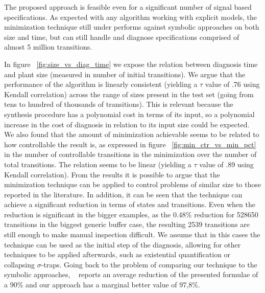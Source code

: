 The proposed approach is feasible even for a significant number of signal based specifications. 
As expected with any algorithm working with explicit models, the minimization technique still under performs against symbolic approaches on both size and time, but can still handle and diagnose specifications comprised of almost 5 million transitions.  

In figure ~\ref{fig:size_vs_diag_time} we expose the relation between diagnosis time and plant size (measured in number of initial transitions). We argue that the performance of the algorithm is linearly consistent (yielding a $\tau$ value of .76 using Kendall correlation) across the range of sizes present in the test set (going from tens to hundred of thousands of transitions). This is relevant because the synthesis procedure has a polynomial cost in terms of its input, so a polynomial increase in the cost of diagnosis in relation to its input size could be expected. 
We also found that the amount of minimization achievable seems to be related to how controllable the result is, as expressed in figure  ~\ref{fig:min_ctr_vs_min_pct} in the number of controllable transitions in the minimization over the number of total transitions. The relation seems to be linear (yielding a $\tau$ value of .89 using Kendall correlation).
From the results it is possible to argue that the minimization technique can be applied to control problems of similar size to those reported in the literature. 
In addition, it can be seen that the technique can achieve a significant reduction in terms of states and transitions. Even when the reduction is significant in the bigger examples, as the 0.48\% reduction for 528650 transitions in the biggest generic buffer case, the resulting 2539 transitions are still enough to make manual inspection difficult. We assume that in this cases the technique can be used as the initial step of the diagnosis, allowing for other techniques to be applied afterwards, such as existential quantification or collapsing $\sigma$-traps.
Going back to the problem of comparing our technique to the symbolic approaches, ~\cite{DBLP:conf/hvc/KonighoferHB10} reports an average reduction of the presented formulae of a 90\% and our approach has a marginal better value of 97,8\%.

